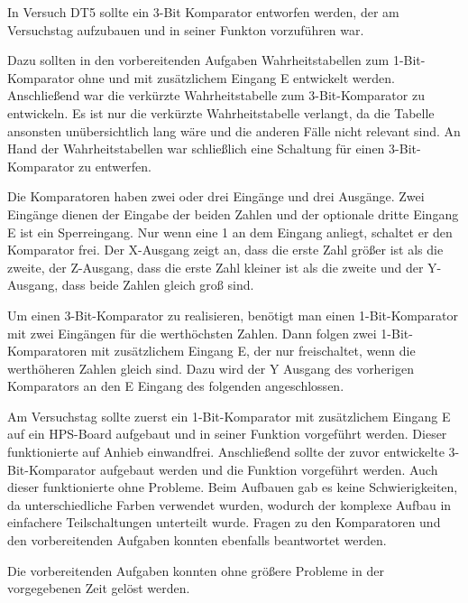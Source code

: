 In Versuch DT5 sollte ein 3-Bit Komparator entworfen werden, der am Versuchstag aufzubauen und in seiner Funkton vorzuführen war. \par
Dazu sollten in den vorbereitenden Aufgaben Wahrheitstabellen zum 1-Bit-Komparator ohne und mit zusätzlichem Eingang E entwickelt werden. Anschließend war die verkürzte Wahrheitstabelle zum 3-Bit-Komparator zu entwickeln. Es ist nur die verkürzte Wahrheitstabelle verlangt, da die Tabelle ansonsten unübersichtlich lang wäre und die anderen Fälle nicht relevant sind. An Hand der Wahrheitstabellen war schließlich eine Schaltung für einen 3-Bit-Komparator zu entwerfen. \par
Die Komparatoren haben zwei oder drei Eingänge und drei Ausgänge. Zwei Eingänge dienen der Eingabe der beiden Zahlen und der optionale dritte Eingang E ist ein Sperreingang. Nur wenn eine 1 an dem Eingang anliegt, schaltet er den Komparator frei. Der X-Ausgang zeigt an, dass die erste Zahl größer ist als die zweite, der Z-Ausgang, dass die erste Zahl kleiner ist als die zweite und der Y-Ausgang, dass beide Zahlen gleich groß sind. \par
Um einen 3-Bit-Komparator zu realisieren, benötigt man einen 1-Bit-Komparator mit zwei Eingängen für die werthöchsten Zahlen. Dann folgen zwei 1-Bit-Komparatoren mit zusätzlichem Eingang E, der nur freischaltet, wenn die werthöheren Zahlen gleich sind. Dazu wird der Y Ausgang des vorherigen Komparators an den E Eingang des folgenden angeschlossen. \par
Am Versuchstag sollte zuerst ein 1-Bit-Komparator mit zusätzlichem Eingang E auf ein HPS-Board aufgebaut und in seiner Funktion vorgeführt werden. Dieser funktionierte auf Anhieb einwandfrei. Anschließend sollte der zuvor entwickelte 3-Bit-Komparator aufgebaut werden und die Funktion vorgeführt werden. Auch dieser funktionierte ohne Probleme. Beim Aufbauen gab es keine Schwierigkeiten, da unterschiedliche Farben verwendet wurden, wodurch der komplexe Aufbau in einfachere Teilschaltungen unterteilt wurde. Fragen zu den Komparatoren und den vorbereitenden Aufgaben konnten ebenfalls beantwortet werden. \par
Die vorbereitenden Aufgaben konnten ohne größere Probleme in der vorgegebenen Zeit gelöst werden.
